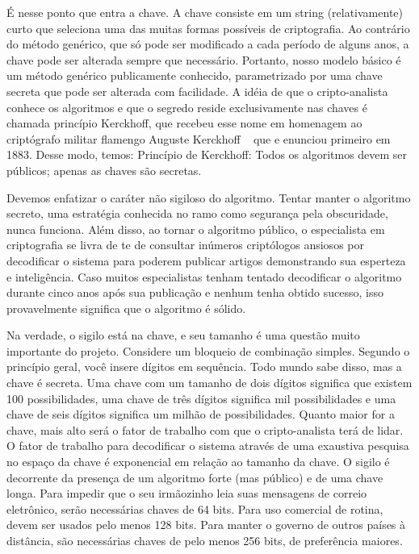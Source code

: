 É nesse ponto que entra a chave. A chave consiste em um string (relativamente) curto que 
seleciona uma das muitas formas possíveis de criptografia. Ao contrário do método genérico, que só pode ser modificado a cada período de alguns anos, a chave pode ser alterada sempre que 
necessário. Portanto, nosso modelo básico é um método genérico publicamente conhecido, 
parametrizado por uma chave secreta que pode ser alterada com facilidade. A idéia de que o 
cripto-analista conhece os algoritmos e que o segredo reside exclusivamente nas chaves é chamada princípio Kerckhoff, que recebeu esse nome em homenagem ao criptógrafo militar flamengo Auguste Kerckhoff ~\cite{tanenbaum} que e enunciou primeiro em 1883. Desse modo, temos: 
Princípio de Kerckhoff: Todos os algoritmos devem ser públicos; apenas as chaves são secretas. 


Devemos enfatizar o caráter não sigiloso do algoritmo. Tentar manter o algoritmo secreto, uma estratégia conhecida no ramo como segurança pela obscuridade, nunca funciona. Além disso, ao tornar o algoritmo público, o especialista em criptografia se livra de te de consultar inúmeros criptólogos ansiosos por decodificar o sistema para poderem publicar artigos demonstrando sua esperteza e inteligência. Caso muitos especialistas tenham tentado decodificar o algoritmo durante cinco anos após sua publicação e nenhum tenha obtido sucesso, isso provavelmente significa que o algoritmo é sólido. 

Na verdade, o sigilo está na chave, e seu tamanho é uma questão muito importante do projeto. 
Considere um bloqueio de combinação simples. Segundo o princípio geral, você insere dígitos em 
sequência. Todo mundo sabe disso, mas a chave é secreta. Uma chave com um tamanho de dois 
dígitos significa que existem 100 possibilidades, uma chave de três dígitos significa mil 
possibilidades e uma chave de seis dígitos significa um milhão de possibilidades. Quanto maior for a chave, mais alto será o fator de trabalho com que o cripto-analista terá de lidar. O fator de trabalho para decodificar o sistema através de uma exaustiva pesquisa no espaço da chave é exponencial em relação ao tamanho da chave. O sigilo é decorrente da presença de um algoritmo forte (mas público) e de uma chave longa. Para impedir que o seu irmãozinho leia suas mensagens de correio eletrônico, serão necessárias chaves de 64 bits. Para uso comercial de rotina, devem ser usados pelo menos 128 bits. Para manter o governo de outros países à distância, são necessárias chaves de pelo menos 256 bits, de preferência maiores.


